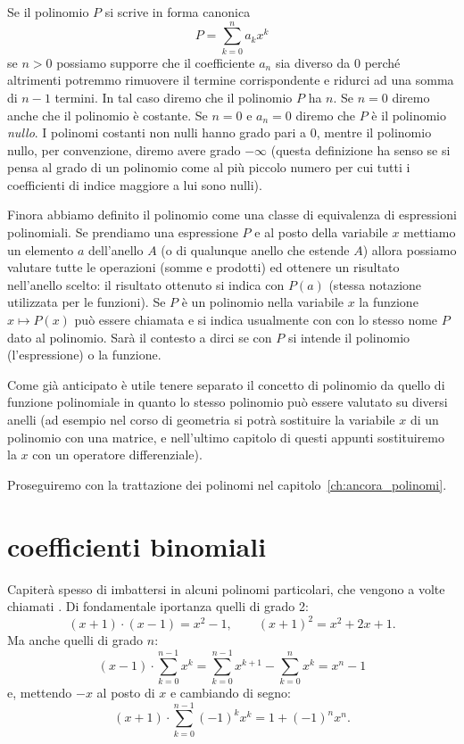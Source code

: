 Se il polinomio $P$ si scrive in forma canonica
\[
  P = \sum_{k=0}^n a_k x^k
\]
se $n>0$ possiamo supporre che il coefficiente $a_n$ sia diverso da $0$ 
perché altrimenti potremmo rimuovere il termine corrispondente e ridurci 
ad una somma di $n-1$ termini. 
In tal caso diremo che il polinomio $P$ ha  $n$.
%
% 
Se $n=0$ diremo anche che il polinomio è costante.
Se $n=0$ e $a_n=0$ diremo che $P$ è il polinomio \emph{nullo}.
I polinomi costanti non nulli hanno grado pari a $0$, mentre il polinomio nullo, 
per convenzione, diremo avere grado $-\infty$ (questa definizione ha senso se si pensa 
al grado di un polinomio come al più piccolo numero per cui tutti i coefficienti di
indice maggiore a lui sono nulli).

Finora abbiamo definito il polinomio come una classe di equivalenza di 
espressioni polinomiali. 
Se prendiamo una espressione $P$ e al posto della variabile $x$ 
mettiamo un elemento $a$ dell'anello $A$ (o di qualunque anello che estende 
$A$) allora possiamo valutare tutte le operazioni (somme e prodotti) ed 
ottenere un risultato nell'anello scelto: il risultato 
ottenuto si indica con $P(a)$ (stessa notazione utilizzata per le funzioni).
Se $P$ è un polinomio nella variabile $x$ la funzione $x\mapsto P(x)$ 
può essere chiamata  e si indica usualmente 
con con lo stesso nome $P$ dato al polinomio. Sarà il contesto a dirci 
se con $P$ si intende il polinomio (l'espressione) o la funzione.

Come già anticipato è utile tenere separato il concetto di polinomio da quello di 
funzione polinomiale in quanto lo stesso polinomio può essere valutato su diversi 
anelli (ad esempio nel corso di geometria si potrà sostituire
la variabile $x$ di un polinomio con una matrice, 
e nell'ultimo capitolo di questi appunti 
sostituiremo la $x$ con un operatore differenziale).

Proseguiremo con la trattazione dei polinomi 
nel capitolo~\ref{ch:ancora_polinomi}.

\section{coefficienti binomiali}
\label{ch:binomiale}

Capiterà spesso di imbattersi in alcuni polinomi particolari, che vengono 
a volte chiamati . 
Di fondamentale iportanza quelli di grado 2:
\[
  (x+1)\cdot(x-1) = x^2-1, \qquad (x+1)^2 = x^2+2x + 1.
\]
Ma anche quelli di grado $n$:
\[
  (x-1)\cdot \sum_{k=0}^{n-1} x^k
  = \sum_{k=0}^{n-1} x^{k+1} - \sum_{k=0}^n x^k = x^n - 1
\]
e, mettendo $-x$ al posto di $x$ e cambiando di segno:
\[
  (x+1)\cdot \sum_{k=0}^{n-1} (-1)^k x^k
  = 1 + (-1)^n x^n.
\]

